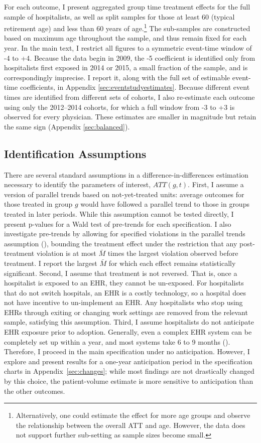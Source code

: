 \documentclass[12pt]{article}
\begin{document}
For each outcome, I present aggregated group time treatment effects for the full sample of hospitalists, as well as split samples for those at least 60 (typical retirement age) and less than 60 years of age.\footnote{Alternatively, one could estimate the effect for more age groups and observe the relationship between the overall ATT and age. However, the data does not support further sub-setting as sample sizes become small.} The sub-samples are constructed based on maximum age throughout the sample, and thus remain fixed for each year. In the main text, I restrict all figures to a symmetric event-time window of -4 to +4. Because the data begin in 2009, the -5 coefficient is identified only from hospitalists first exposed in 2014 or 2015, a small fraction of the sample, and is correspondingly imprecise. I report it, along with the full set of estimable event-time coefficients, in Appendix \ref{sec:eventstudyestimates}. Because different event times are identified from different sets of cohorts, I also re-estimate each outcome using only the 2012–2014 cohorts, for which a full window from -3 to +3 is observed for every physician. These estimates are smaller in magnitude but retain the same sign (Appendix \ref{sec:balanced}).

\subsection{Identification Assumptions}

There are several standard assumptions in a difference-in-differences estimation necessary to identify the parameters of interest, $ATT(g,t)$. First, I assume a version of parallel trends based on not-yet-treated units: average outcomes for those treated in group $g$ would have followed a parallel trend to those in groups treated in later periods. While this assumption cannot be tested directly, I present p-values for a Wald test of pre-trends for each specification. I also investigate pre-trends by allowing for specified violations in the parallel trends assumption (\cite{rambachan2019honest}), bounding the treatment effect under the restriction that any post-treatment violation is at most $\bar{M}$ times the largest violation observed before treatment. I report the largest $\bar{M}$ for which each effect remains statistically significant. Second, I assume that treatment is not reversed. That is, once a hospitalist is exposed to an EHR, they cannot be un-exposed. For hospitalists that do not switch hospitals, an EHR is a costly technology, so a hospital does not have incentive to un-implement an EHR. Any hospitalists who stop using EHRs through exiting or changing work settings are removed from the relevant sample, satisfying this assumption. Third, I assume hospitalists do not anticipate EHR exposure prior to adoption. Generally, even a complex EHR system can be completely set up within a year, and most systems take 6 to 9 months (\cite{uzialko_2021}). Therefore, I proceed in the main specification under no anticipation. However, I explore and present results for a one-year anticipation period in the specification charts in Appendix~\ref{sec:changes}; while most findings are not drastically changed by this choice, the patient-volume estimate is more sensitive to anticipation than the other outcomes.
\end{document}

